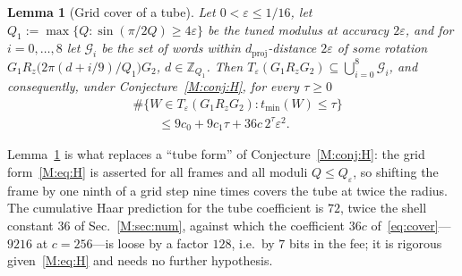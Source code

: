 \documentclass[aps,prx,twocolumn,superscriptaddress,nofootinbib,longbibliography]{revtex4-2}
\theoremstyle{plain}
\newtheorem{lemma}{Lemma}
\theoremstyle{definition}
\theoremstyle{remark}
\newcommand{\dproj}{d_{\mathrm{proj}}}
\newcommand{\Z}{\mathbb{Z}}
\begin{document}
\begin{lemma}[Grid cover of a tube]\label{lem:cover}
Let $0<\varepsilon\le1/16$, let $Q_1:=\max\{Q:\sin(\pi/2Q)\ge4\varepsilon\}$ be the tuned modulus at accuracy $2\varepsilon$, and for $i=0,\dots,8$ let $\mathcal G_i$ be the set of words within $\dproj$-distance $2\varepsilon$ of some rotation $G_1R_z\big(2\pi(d+i/9)/Q_1\big)G_2$, $d\in\Z_{Q_1}$. Then $T_\varepsilon(G_1R_zG_2)\subseteq\bigcup_{i=0}^8\mathcal G_i$, and consequently, under Conjecture~\ref{M:conj:H}, for every $\tau\ge0$
\begin{equation}\label{eq:cover}
\begin{aligned}
&\#\{W\in T_\varepsilon(G_1R_zG_2):t_{\min}(W)\le\tau\}\\
&\qquad\le9c_0+9c_1\tau+36c\,2^\tau\varepsilon^2.
\end{aligned}
\end{equation}
\end{lemma}
Lemma~\ref{lem:cover} is what replaces a ``tube form'' of Conjecture~\ref{M:conj:H}: the grid form~\eqref{M:eq:H} is asserted for all frames and all moduli $Q\le Q_\varepsilon$, so shifting the frame by one ninth of a grid step nine times covers the tube at twice the radius. The cumulative Haar prediction for the tube coefficient is $72$, twice the shell constant $36$ of Sec.~\ref{M:sec:num}, against which the coefficient $36c$ of~\eqref{eq:cover}---$9216$ at $c=256$---is loose by a factor $128$, i.e.\ by $7$ bits in the fee; it is rigorous given~\eqref{M:eq:H} and needs no further hypothesis.
\end{document}
